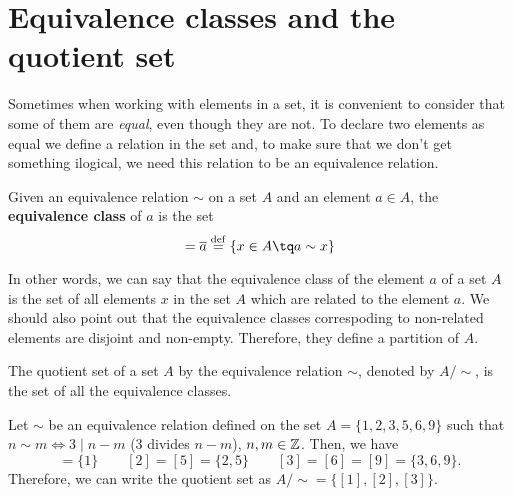 \section{Equivalence classes and the quotient set}
Sometimes when working with elements in a set, it is convenient to consider that some of them are \textit{equal}, even though they are not. To declare two elements as equal we define a relation in the set and, to make sure that we don't get something ilogical, we need this relation to be an equivalence relation.

\begin{defi}
Given an equivalence relation $\sim$ on a set $A$ and an element $a\in A$, the \textbf{equivalence class} of $a$ is the set
    \begin{equation}
        [a] = \overline{a} \bydef \{x\in A \tq a\sim x\}
    \end{equation}
\end{defi}

In other words, we can say that the equivalence class of the element $a$ of a set $A$ is the set of all
elements $x$ in the set $A$ which are related to the element $a$. We should also point out that the
equivalence classes correspoding to non-related elements are disjoint and non-empty. Therefore, they
define a partition of $A$.

\begin{defi}
    The quotient set of a set $A$ by the equivalence relation $\sim$, denoted by $A / \sim$, is the set of all the equivalence classes.
\end{defi}

\begin{example}
    Let $\sim$ be an equivalence relation defined on the set $A = \{1, 2, 3, 5, 6, 9\} $ such that $n\sim m
    \iff 3\mid n - m$ (3 divides $n - m$), $n, m\in\mathbb{Z}$. Then, we have
    \begin{equation}
        [1] = \{1\}\quad\quad [2] = [5] = \{2, 5\}\quad\quad [3] = [6] = [9] = \{3, 6, 9\}.
    \end{equation}
    Therefore, we can write the quotient set as $A / \sim = \{[1], [2], [3]\} $.
\end{example}


